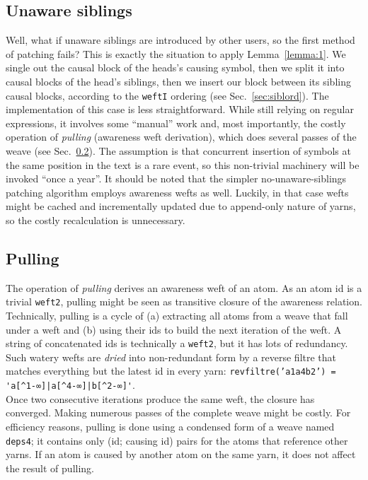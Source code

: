 \documentclass{sig-alternate}
\begin{document}
\subsection{Unaware siblings} \label{sec:unre}

Well, what if unaware siblings are introduced by other users, so the first method of patching fails?
This is exactly the situation to apply Lemma~\ref{lemma:1}. 
We single out the causal block of the heads's causing symbol, then we split it into causal blocks of the head's siblings, then we insert our block between its sibling causal blocks, according to the {\tt weftI} ordering (see Sec.~\ref{sec:siblord}).
The implementation of this case is less straightforward.
While still relying on regular expressions, it involves some ``manual'' work and, most importantly, the costly operation of \emph{pulling} (awareness weft derivation), which does several passes of the weave (see Sec.~\ref{sec:pulling}).
The assumption is that concurrent insertion of symbols at the same position in the text is a rare event, so this non-trivial machinery will be invoked ``once a year''.
It should be noted that the simpler no-unaware-siblings patching algorithm employs awareness wefts as well.
Luckily, in that case wefts might be cached and incrementally updated due to append-only nature of yarns, so the costly recalculation is unnecessary.

\subsection{Pulling} \label{sec:pulling}

The operation of \emph{pulling} derives an awareness weft of an atom.
As an atom id is a trivial {\tt weft2}, pulling might be seen as transitive closure of the awareness relation.
Technically, pulling is a cycle of (a) extracting all atoms from a weave that fall under a weft and (b) using their ids to build the next iteration of the weft.
A string of concatenated ids is technically a {\tt weft2}, but it has lots of redundancy.
Such watery wefts are \emph{dried} into non-redundant form by a reverse filtre that matches everything but the latest id in every yarn:
{\tt revfiltre('a1a4b2') = \verb+'a[^1-∞]|a[^4-∞]|b[^2-∞]'+}.\\
Once two consecutive iterations produce the same weft, the closure has converged.
Making numerous passes of the complete weave might be costly.
For efficiency reasons, pulling is done using a condensed form of a weave named {\tt deps4}; it contains only (id; causing id) pairs for the atoms that reference other yarns.
If an atom is caused by another atom on the same yarn, it does not affect the result of pulling. 
\end{document}
